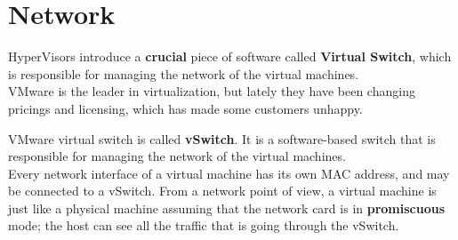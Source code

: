 \section{Network}
HyperVisors introduce a \textbf{crucial} piece of software called \textbf{Virtual Switch}, which is responsible for managing the network of the virtual machines.\\
VMware is the leader in virtualization, but lately they have been changing pricings and licensing, which has made some customers unhappy.
{\ns{}}

VMware virtual switch is called \textbf{vSwitch}. It is a software-based switch that is responsible for managing the network of the virtual machines.\\
Every network interface of a virtual machine has its own MAC address, and may be connected to a vSwitch.
From a network point of view, a virtual machine is just like a physical machine  assuming that the network card is in \textbf{promiscuous} mode; the host can see all the traffic that is going through the vSwitch.
